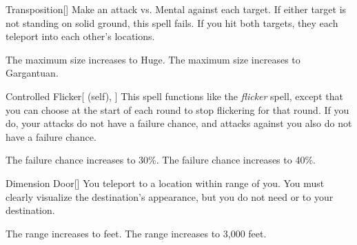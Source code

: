 \lowercase{\hypertarget{spell:Transposition}{}}\label{spell:Transposition}
\begin{freeability}[Rank 3]{\hypertarget{spell:Transposition}{Transposition}}[]
Make an attack vs. Mental against each target.
If either target is not standing on solid ground, this spell fails.
If you hit both targets, they each teleport into each other's locations.

\rankline
{} The maximum size increases to Huge.
 The maximum size increases to Gargantuan.

\end{freeability}
\vspace{0.25em}



\lowercase{\hypertarget{spell:Controlled Flicker}{}}\label{spell:Controlled Flicker}
\begin{attuneability}[Rank 4]{\hypertarget{spell:Controlled Flicker}{Controlled Flicker}}[ (self), ]
This spell functions like the \textit{flicker} spell, except that you can choose at the start of each round to stop flickering for that round.
If you do, your attacks do not have a failure chance, and attacks against you also do not have a failure chance.

\rankline
{} The failure chance increases to 30\%.
 The failure chance increases to 40\%.

\end{attuneability}
\vspace{0.25em}



\lowercase{\hypertarget{spell:Dimension Door}{}}\label{spell:Dimension Door}
\begin{freeability}[Rank 4]{\hypertarget{spell:Dimension Door}{Dimension Door}}[]
You teleport to a location within \rnglong range of you.
You must clearly visualize the destination's appearance, but you do not need  or  to your destination.

\rankline
{} The range increases to \rngext feet.
 The range increases to 3,000 feet.

\end{freeability}
\vspace{0.25em}



